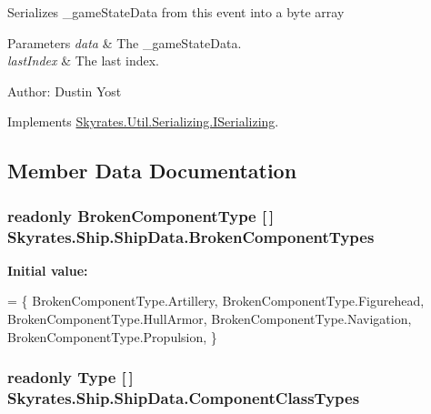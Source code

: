 Serializes \-\_\-game\-State\-Data from this event into a byte array 


\begin{DoxyParams}{Parameters}
{\em data} & The \-\_\-game\-State\-Data.\\
\hline
{\em last\-Index} & The last index.\\
\hline
\end{DoxyParams}


Author\-: Dustin Yost 

Implements \hyperlink{interface_skyrates_1_1_util_1_1_serializing_1_1_i_serializing_aa2b42f27df9eba772b9a854d37aa3b96}{Skyrates.\-Util.\-Serializing.\-I\-Serializing}.



\subsection{Member Data Documentation}
\hypertarget{class_skyrates_1_1_ship_1_1_ship_data_a97ef660eff8374808908b8c5187ee6e6}{
\subsubsection[{Broken\-Component\-Types}]{\setlength{\rightskip}{0pt plus 5cm}readonly Broken\-Component\-Type \mbox{[}$\,$\mbox{]} Skyrates.\-Ship.\-Ship\-Data.\-Broken\-Component\-Types\hspace{0.3cm}{\ttfamily [static]}}}\label{class_skyrates_1_1_ship_1_1_ship_data_a97ef660eff8374808908b8c5187ee6e6}
{\bfseries Initial value\-:}
\begin{DoxyCode}
=
        \{
            BrokenComponentType.Artillery,
            BrokenComponentType.Figurehead,
            BrokenComponentType.HullArmor,
            BrokenComponentType.Navigation,
            BrokenComponentType.Propulsion,
        \}
\end{DoxyCode}
\hypertarget{class_skyrates_1_1_ship_1_1_ship_data_a64cb204f6025333d43c3a8ce393c2b45}{
\subsubsection[{Component\-Class\-Types}]{\setlength{\rightskip}{0pt plus 5cm}readonly Type \mbox{[}$\,$\mbox{]} Skyrates.\-Ship.\-Ship\-Data.\-Component\-Class\-Types\hspace{0.3cm}{\ttfamily [static]}}}\label{class_skyrates_1_1_ship_1_1_ship_data_a64cb204f6025333d43c3a8ce393c2b45}
